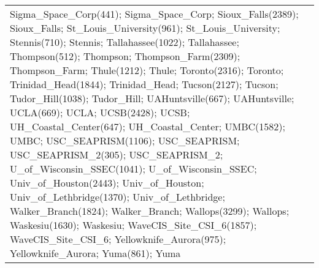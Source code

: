 \documentclass[journal abbreviation, manuscript]{copernicus}
\begin{document}
\begin{table}
\begin{tabularx}{\textwidth}{lX}
Sigma\_Space\_Corp(441); Sigma\_Space\_Corp; Sioux\_Falls(2389); Sioux\_Falls; St\_Louis\_University(961); St\_Louis\_University; Stennis(710); Stennis; Tallahassee(1022); Tallahassee; Thompson(512); Thompson; Thompson\_Farm(2309); Thompson\_Farm; Thule(1212); Thule; Toronto(2316); Toronto; Trinidad\_Head(1844); Trinidad\_Head; Tucson(2127); Tucson; Tudor\_Hill(1038); Tudor\_Hill; UAHuntsville(667); UAHuntsville; UCLA(669); UCLA; UCSB(2428); UCSB; UH\_Coastal\_Center(647); UH\_Coastal\_Center; UMBC(1582); UMBC; USC\_SEAPRISM(1106); USC\_SEAPRISM; USC\_SEAPRISM\_2(305); USC\_SEAPRISM\_2; U\_of\_Wisconsin\_SSEC(1041); U\_of\_Wisconsin\_SSEC; Univ\_of\_Houston(2443); Univ\_of\_Houston; Univ\_of\_Lethbridge(1370); Univ\_of\_Lethbridge; Walker\_Branch(1824); Walker\_Branch; Wallops(3299); Wallops; Waskesiu(1630); Waskesiu; WaveCIS\_Site\_CSI\_6(1857); WaveCIS\_Site\_CSI\_6; Yellowknife\_Aurora(975); Yellowknife\_Aurora; Yuma(861); Yuma \\

\end{tabularx}
\end{table}
\end{document}
